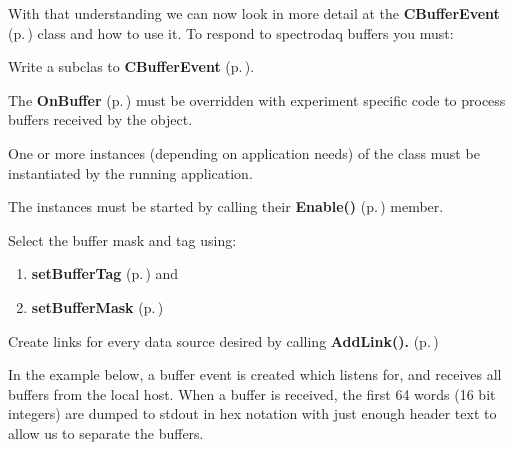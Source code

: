 With that understanding we can now look in more detail at the {\bf CBuffer\-Event} {\rm (p.\,\pageref{classCBufferEvent})} class and how to use it. To respond to spectrodaq buffers you must:\begin{CompactItemize}
\item 
Write a subclas to {\bf CBuffer\-Event} {\rm (p.\,\pageref{classCBufferEvent})}.\item 
The {\bf On\-Buffer} {\rm (p.\,\pageref{classCBufferEvent_a10})} must be overridden with experiment specific code to process buffers received by the object.\item 
One or more instances (depending on application needs) of the class must be instantiated by the running application.\item 
The instances must be started by calling their  {\bf Enable()} {\rm (p.\,\pageref{classCEvent_a11})} member.\item 
Select the buffer mask and tag using:\begin{enumerate}
\item 
{\bf set\-Buffer\-Tag} {\rm (p.\,\pageref{classCBufferEvent_a12})} and\item 
{\bf set\-Buffer\-Mask} {\rm (p.\,\pageref{classCBufferEvent_a13})}\end{enumerate}
\item 
Create links for every data source desired by calling {\bf Add\-Link().} {\rm (p.\,\pageref{classCBufferEvent_a8})}\end{CompactItemize}
In the example below, a buffer event is created which listens for, and receives all buffers from the local host. When a buffer is received, the first 64 words (16 bit integers) are dumped to stdout in hex notation with just enough header text to allow us to separate the buffers.



